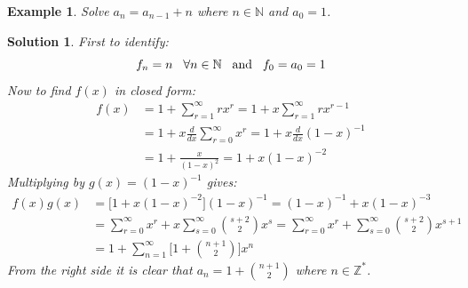 \documentclass[12pt, letterpaper, onecolumn, conference, final]{IEEEtran}
\theoremstyle{definition}
\theoremstyle{plain}
\newtheorem{example}{Example}[section]
\newtheorem{solution}{Solution}[section]
\begin{document}
\newpage
\begin{example}
Solve $a_n=a_{n-1}+n$ where $n \in \mathbb{N}$ and $a_0=1$.
\end{example}
\begin{solution}
First to identify:
\begin{equation*}
f_n = n \hspace{.3cm} \forall n \in \mathbb{N} \hspace{.3cm} \text{and} \hspace{.3cm} f_0 = a_0 = 1
\end{equation*}
Now to find $f(x)$ in closed form:
\begin{equation*}
\begin{split}
f(x) &= 1 + \sum_{r=1}^\infty rx^r = 1 + x\sum_{r=1}^\infty rx^{r-1} \\
&= 1 + x \frac{d}{dx} \sum_{r=0}^\infty x^r = 1 + x \frac{d}{dx} (1-x)^{-1} \\
&= 1 + \frac{x}{(1-x)^2} = 1 + x(1-x)^{-2}
\end{split}
\end{equation*}
Multiplying by $g(x) = (1-x)^{-1}$ gives:
\begin{equation*}
\begin{split}
f(x)g(x) &= \Big[ 1 + x(1-x)^{-2} \Big] (1-x)^{-1} = (1-x)^{-1} + x(1-x)^{-3} \\
&= \sum_{r=0}^\infty x^r + x\sum_{s=0}^\infty {s+2 \choose 2} x^s = \sum_{r=0}^\infty x^r + \sum_{s=0}^\infty {s+2 \choose 2} x^{s+1} \\
&= 1 + \sum_{n=1}^\infty \Big[ 1 + {n+1 \choose 2} \Big] x^n
\end{split}
\end{equation*}
From the right side it is clear that $a_n = 1 + {n+1 \choose 2}$ where $n \in \mathbb{Z}^*$.
\end{solution}
\end{document}
